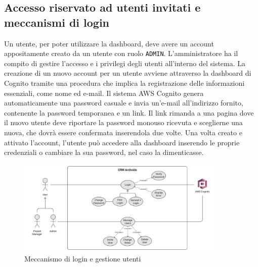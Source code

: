 \documentclass[target=bach,aauheader=,style=]{thud}
\begin{document}
\subsection{Accesso riservato ad utenti invitati e meccanismi di login}
Un utente, per poter utilizzare la dashboard, deve avere un account appositamente creato da un utente con ruolo \texttt{ADMIN}. L'amministratore ha il compito di gestire l'accesso e i privilegi degli utenti all'interno del sistema. La creazione di un nuovo account per un utente avviene attraverso la dashboard di Cognito tramite una procedura che implica la registrazione delle informazioni essenziali, come nome ed e-mail. Il sistema AWS Cognito genera automaticamente una password casuale e invia un'e-mail all'indirizzo fornito, contenente la password temporanea e un link. Il link rimanda a una pagina dove il nuovo utente deve riportare la password monouso ricevuta e sceglierne una nuova, che dovrà essere confermata inserendola due volte. Una volta creato e attivato l'account, l'utente può accedere alla dashboard inserendo le proprie credenziali o cambiare la sua password, nel caso la dimenticasse.

\begin{figure}[H]
    \centering
    \includegraphics[width=0.9\textwidth]{img/diagrammi/use_case_login_e_manage.pdf} 
    \caption{Meccanismo di login e gestione utenti}
\end{figure}
\end{document}
